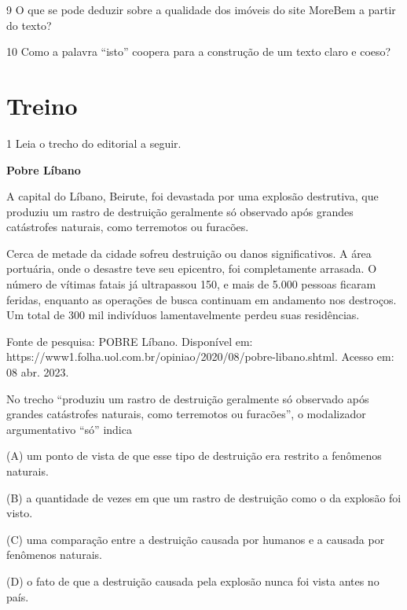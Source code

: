 \begin{itemize}
\begin{itemize}
\num{9} O que se pode deduzir sobre a qualidade dos imóveis do site
MoreBem a partir do texto? 

\num{10} Como a palavra ``isto'' coopera para a construção de um texto
claro e coeso? 

\section{Treino}

\num{1} Leia o trecho do editorial a seguir.

\textbf{Pobre Líbano}

A capital do Líbano, Beirute, foi devastada por uma explosão destrutiva,
que produziu um rastro de destruição geralmente só observado após
grandes catástrofes naturais, como terremotos ou furacões.

Cerca de metade da cidade sofreu destruição ou danos significativos. A
área portuária, onde o desastre teve seu epicentro, foi completamente
arrasada. O número de vítimas fatais já ultrapassou 150, e mais de 5.000
pessoas ficaram feridas, enquanto as operações de busca continuam em
andamento nos destroços. Um total de 300 mil indivíduos lamentavelmente
perdeu suas residências.

Fonte de pesquisa: POBRE Líbano. Disponível em:
https://www1.folha.uol.com.br/opiniao/2020/08/pobre-libano.shtml. Acesso
em: 08 abr. 2023.

No trecho ``produziu um rastro de destruição geralmente só observado
após grandes catástrofes naturais, como terremotos ou furacões'', o
modalizador argumentativo ``só'' indica

(A) um ponto de vista de que esse tipo de destruição era restrito a
fenômenos naturais.

(B) a quantidade de vezes em que um rastro de destruição como o da
explosão foi visto.

(C) uma comparação entre a destruição causada por humanos e a causada
por fenômenos naturais.

(D) o fato de que a destruição causada pela explosão nunca foi vista
antes no país.


\end{itemize}
\end{itemize}
